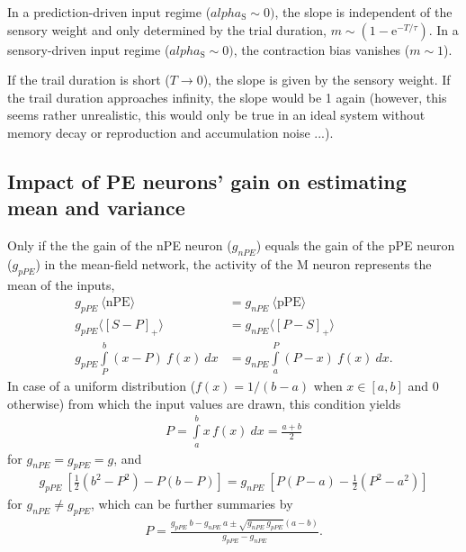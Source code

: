 \documentclass[10pt,a4paper,draft]{article}
\begin{document}
In a prediction-driven input regime ($alpha_\mathrm{S} \sim 0)$, the slope is independent of the sensory weight and only determined by the trial duration, $m \sim \left( 1 -   \mathrm{e}^{-T/\tau} \right)$. In a sensory-driven input regime ($alpha_\mathrm{S} \sim 0)$, the contraction bias vanishes ($m \sim 1$). 

If the trail duration is short ($T \rightarrow 0$), the slope is given by the sensory weight. If the trail duration approaches infinity, the slope would be 1 again (however, this seems rather unrealistic, this would only be true in an ideal system without memory decay or reproduction and accumulation noise ...).

\subsection*{Impact of PE neurons' gain on estimating mean and variance}
%
Only if the the gain of the nPE neuron ($g_{nPE}$) equals the gain of the pPE neuron ($g_{pPE}$) in the mean-field network, the activity of the M neuron represents the mean of the inputs,
%
\begin{align}
\label{eq:condition_mean_gain_equal}
g_{pPE}\ \langle \mathrm{nPE}\rangle &= g_{nPE}\ \langle \mathrm{pPE}\rangle \\
g_{pPE} \langle \left[ S-P\right]_+\rangle &= g_{nPE} \langle \left[ P-S\right]_+\rangle \nonumber \\
g_{pPE} \int\limits_P^b \left( x-P\right)\ f(x)\ dx &= g_{nPE} \int\limits_a^P \left( P-x\right)\ f(x)\ dx. \nonumber
\end{align}
%
In case of a uniform distribution ($f(x) = 1/(b-a)$ when $x\in [a,b]$ and $0$ otherwise) from which the input values are drawn, this condition yields
%
\begin{align}
\label{eq:condition_mean_gain_equal_4_uniform_dist_1}
P = \int\limits_a^b x\, f(x)\ dx = \frac{a + b}{2}
\end{align}
%
for $g_{nPE} = g_{pPE} = g$, and 
%
\begin{align}
\label{eq:condition_mean_gain_equal_4_uniform_dist_21}
g_{pPE}\ \left[ \frac{1}{2} \left(b^2 - P^2\right) - P\left(b - P\right)\right] = g_{nPE}\ \left[  P\left(P - a\right) - \frac{1}{2} \left(P^2 - a^2\right)\right]
\end{align}
%
for $g_{nPE} \neq g_{pPE}$, which can be further summaries by
%
\begin{align}
\label{eq:condition_mean_gain_equal_4_uniform_dist_21}
P = \frac{g_{pPE}\ b - g_{nPE}\ a \pm \sqrt{g_{nPE}\ g_{pPE}} (a-b)}{g_{pPE} - g_{nPE}}.
\end{align}
\end{document}
